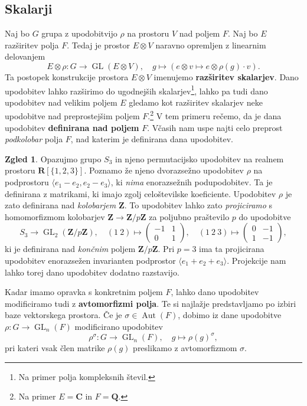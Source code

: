 \documentclass[11pt]{book}
\def\ZZ{\mathbf{Z}}
\def\QQ{\mathbf{Q}}
\def\RR{\mathbf{R}}
\def\CC{\mathbf{C}}
\DeclareMathOperator\Aut{Aut}
\DeclareMathOperator\GL{GL}
\def\definicija{\color{rdeca}\bf}
\theoremstyle{definition}
\theoremstyle{zgled}
\newtheorem{zgled}[theorem]{Zgled}
\theoremstyle{zgledbrezstevilke}
\theoremstyle{odprtproblem}
\theoremstyle{domacanaloga}
\theoremstyle{izrek}
\begin{document}
\subsection{Skalarji}

Naj bo $G$ grupa z upodobitvijo $\rho$ na prostoru $V$ nad poljem $F$. Naj bo $E$ razširitev polja $F$. Tedaj je prostor $E \otimes V$ naravno opremljen z linearnim delovanjem
\[
    E \otimes \rho \colon G \to \GL(E \otimes V), \quad
    g \mapsto \left( e \otimes v \mapsto e  \otimes \rho(g) \cdot v \right).
\]
Ta postopek konstrukcije prostora $E \otimes V$ imenujemo {\definicija razširitev skalarjev}. Dano upodobitev lahko razširimo do ugodnejših skalarjev\footnote{Na primer polja kompleksnih števil.}, lahko pa tudi dano upodobitev nad velikim poljem $E$ gledamo kot razširitev skalarjev neke upodobitve nad preprostejšim poljem $F$.\footnote{Na primer $E = \CC$ in $F = \QQ$.} V tem primeru rečemo, da je dana upodobitev {\definicija definirana nad poljem} $F$. Včasih nam uspe najti celo preprost \emph{podkolobar} polja $F$, nad katerim je definirana dana upodobitev.

\begin{zgled}
Opazujmo grupo $S_3$ in njeno permutacijsko upodobitev na realnem prostoru $\RR[\{ 1, 2, 3 \}]$. Poznamo že njeno dvorazsežno upodobitev $\rho$ na podprostoru $\langle e_1 - e_2, e_2 - e_3 \rangle$, ki \emph{nima} enorazsežnih podupodobitev. Ta je definirana z matrikami, ki imajo zgolj celoštevilske koeficiente. Upodobitev $\rho$ je zato definirana nad \emph{kolobarjem} $\ZZ$. To upodobitev lahko zato \emph{projiciramo} s homomorfizmom kolobarjev $\ZZ \to \ZZ/p\ZZ$ za poljubno praštevilo $p$ do upodobitve
\[
    S_3 \to {\textstyle \GL_2(\ZZ/p\ZZ)}, \quad
    (1 \ 2) \mapsto \begin{pmatrix} 
        -1 & 1 \\ 0 & 1 
    \end{pmatrix}, \quad
    (1 \ 2 \ 3) \mapsto \begin{pmatrix} 
        0 & -1 \\ 1 & -1
    \end{pmatrix},
\]
ki je definirana nad \emph{končnim} poljem $\ZZ/p\ZZ$. Pri $p = 3$ ima ta projicirana upodobitev enorazsežen invarianten podprostor $\langle e_1 + e_2 + e_3 \rangle$. Projekcije nam lahko torej dano upodobitev dodatno razstavijo.
\end{zgled}

Kadar imamo opravka s konkretnim poljem $F$, lahko dano upodobitev modificiramo tudi z {\definicija avtomorfizmi polja}. Te si najlažje predstavljamo po izbiri baze vektorskega prostora. Če je $\sigma \in \Aut(F)$, dobimo iz dane upodobitve  $\rho \colon G \to \GL_n(F)$ modificirano upodobitev
\[
    \rho^\sigma \colon G \to {\textstyle \GL_n(F)}, \quad
    g \mapsto \rho(g)^\sigma,
\]
pri kateri vsak člen matrike $\rho(g)$ preslikamo z avtomorfizmom $\sigma$.
\end{document}
